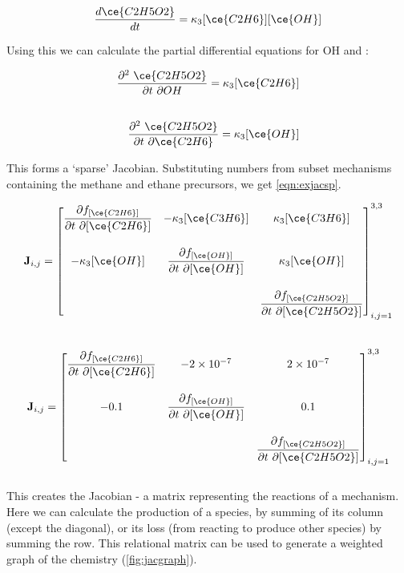 \begin{equation}
    \frac{d\ce{C2H5O2}}{dt} = \kappa_3 [\ce{C2H6}][\ce{OH}]
\end{equation}

Using this we can calculate the partial differential equations for OH and :

\begin{eqnarray}
    \frac{\partial ^2 \ \ce{C2H5O2} }{\partial t \ \partial OH} = \kappa_3 [\ce{C2H6}] \\[20pt]
    \frac{\partial ^2 \ \ce{C2H5O2} }{\partial t \ \partial \ce{C2H6}} = \kappa_3 [\ce{OH}]
\end{eqnarray}


This forms a `sparse' Jacobian. Substituting numbers from subset mechanisms containing the methane and ethane precursors, we get \autoref{eqn:exjacsp}.





\begin{eqnarray}
 \mathbf{J}_{i,j} =
\begin{bmatrix}
\dfrac{\partial f_{[\ce{C2H6}]}}{\partial t \ \partial {[\ce{C2H6}]}} &
  - \kappa_3[\ce{C3H6}] &
  \kappa_3[\ce{C3H6}] \\[20pt]
-\kappa_3[\ce{OH}] &
  \dfrac{\partial f_{[\ce{OH}]}}{\partial t \ \partial {[\ce{OH}]}} &
\kappa_3[\ce{OH}] \\[20pt]
\  &
 \  &
  \dfrac{\partial f_{[\ce{C2H5O2}]}}{\partial t \ \partial {[\ce{C2H5O2}]}}
\end{bmatrix}_{i,j=1}^{3,3}
\label{eqn:exjacsppre}
\end{eqnarray}\\



   \begin{eqnarray}
    \mathbf{J}_{i,j} =
 \begin{bmatrix}
   \dfrac{\partial f_{[\ce{C2H6}]}}{\partial t \ \partial {[\ce{C2H6}]}} &
     - 2\times 10^{-7} &
     2\times 10^{-7} \\[20pt]
   -0.1 &
     \dfrac{\partial f_{[\ce{OH}]}}{\partial t \ \partial {[\ce{OH}]}} &
  0.1 \\[20pt]
   \  &
    \  &
     \dfrac{\partial f_{[\ce{C2H5O2}]}}{\partial t \ \partial {[\ce{C2H5O2}]}}
 \end{bmatrix}_{i,j=1}^{3,3}
 \label{eqn:exjacsp}
\end{eqnarray}\\

This creates the Jacobian - a matrix representing the reactions of a mechanism. Here we can calculate the production of a species, by summing of its column (except the diagonal), or its loss (from reacting to produce other species) by summing the row. This relational matrix can be used to generate a weighted graph of the chemistry (\autoref{fig:jacgraph}).

